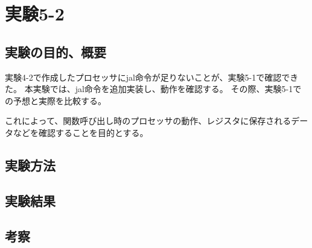 \section{実験5-2}
\subsection{実験の目的、概要}
実験4-2で作成したプロセッサにjal命令が足りないことが、実験5-1で確認できた。
本実験では、jal命令を追加実装し、動作を確認する。
その際、実験5-1での予想と実際を比較する。

これによって、関数呼び出し時のプロセッサの動作、レジスタに保存されるデータなどを確認することを目的とする。

\subsection{実験方法}

\subsection{実験結果}

\subsection{考察}
